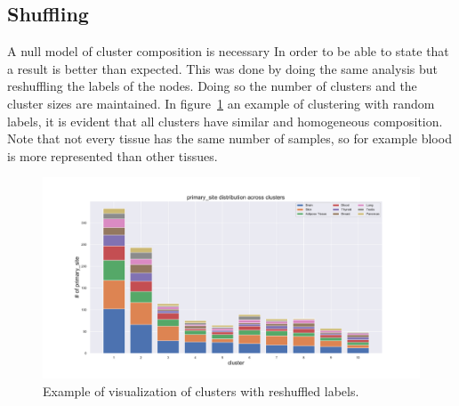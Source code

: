 \subsection{Shuffling}
A null model of cluster composition is necessary In order to be able to state that a result is better than expected. This was done by doing the same analysis but reshuffling the labels of the nodes. Doing so the number of clusters and the cluster sizes are maintained. In figure~\ref{fig:topic/gtex/oversigma_10tissue/shuffledclustercomposition_l3_primary_site} an example of clustering with random labels, it is evident that all clusters have similar and homogeneous composition. Note that not every tissue has the same number of samples, so for example blood is more represented than other tissues.
\begin{figure}[htb!]
	\centering
	\includegraphics[width=0.8\linewidth]{pictures/topic/gtex/oversigma_10tissue/shuffledclustercomposition_l3_primary_site}
	\caption{Example of visualization of clusters with reshuffled labels.}
	\label{fig:topic/gtex/oversigma_10tissue/shuffledclustercomposition_l3_primary_site}
\end{figure}

